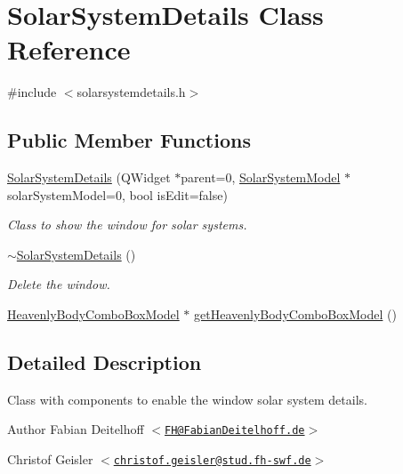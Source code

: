 \hypertarget{classSolarSystemDetails}{
\section{\-Solar\-System\-Details \-Class \-Reference}
\label{d7/d6d/classSolarSystemDetails}
}


{\ttfamily \#include $<$solarsystemdetails.\-h$>$}

\subsection*{\-Public \-Member \-Functions}
\begin{DoxyCompactItemize}
\item 
\hyperlink{classSolarSystemDetails_aec6ecd363afc28b48c32d13664932da4}{\-Solar\-System\-Details} (\-Q\-Widget $\ast$parent=0, \hyperlink{classSolarSystemModel}{\-Solar\-System\-Model} $\ast$solar\-System\-Model=0, bool is\-Edit=false)
\begin{DoxyCompactList}\small\item\em \-Class to show the window for solar systems. \end{DoxyCompactList}\item 
\hyperlink{classSolarSystemDetails_ac49dcc9ed2db5e6591a4d0e3296aa31f}{$\sim$\-Solar\-System\-Details} ()
\begin{DoxyCompactList}\small\item\em \-Delete the window. \end{DoxyCompactList}\item 
\hyperlink{classHeavenlyBodyComboBoxModel}{\-Heavenly\-Body\-Combo\-Box\-Model} $\ast$ \hyperlink{classSolarSystemDetails_af8aceddb464317fcd236792f9a6b19a6}{get\-Heavenly\-Body\-Combo\-Box\-Model} ()
\end{DoxyCompactItemize}


\subsection{\-Detailed \-Description}
\-Class with components to enable the window solar system details.

\begin{DoxyAuthor}{\-Author}
\-Fabian \-Deitelhoff $<$\href{mailto:FH@FabianDeitelhoff.de}{\tt \-F\-H@\-Fabian\-Deitelhoff.\-de}$>$ 

\-Christof \-Geisler $<$\href{mailto:christof.geisler@stud.fh-swf.de}{\tt christof.\-geisler@stud.\-fh-\/swf.\-de}$>$ 
\end{DoxyAuthor}


